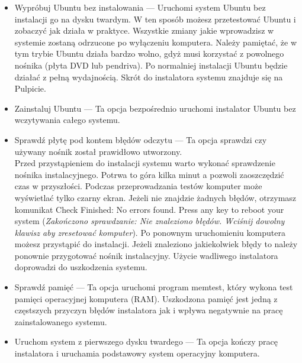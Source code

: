 \begin{itemize}
\item \textcolor{ubuntu_orange}{Wypróbuj Ubuntu bez instalowania} --- Uruchomi system Ubuntu bez instalacji go na dysku twardym. W ten sposób możesz przetestować Ubuntu i zobaczyć jak działa w praktyce. Wszystkie zmiany jakie wprowadzisz w systemie zostaną odrzucone po wyłączeniu komputera. Należy pamiętać, że w tym trybie Ubuntu działa bardzo wolno, gdyż musi korzystać z powolnego nośnika (płyta DVD lub pendriva). Po normalniej instalacji Ubuntu będzie działać z pełną wydajnością. Skrót do instalatora systemu znajduje się na Pulpicie.
\item \textcolor{ubuntu_orange}{Zainstaluj Ubuntu} --- Ta opcja bezpośrednio uruchomi instalator Ubuntu bez wczytywania całego systemu.
\item \textcolor{ubuntu_orange}{Sprawdź płytę pod kontem błędów odczytu} --- Ta opcja sprawdzi czy używany nośnik został prawidłowo utworzony.\\
Przed przystąpieniem do instalacji systemu warto wykonać sprawdzenie nośnika instalacyjnego. Potrwa to góra kilka minut a pozwoli zaoszczędzić czas w przyszłości. Podczas przeprowadzania testów komputer może wyświetlać tylko czarny ekran. Jeżeli nie znajdzie żadnych błędów, otrzymasz komunikat \textcolor{ubuntu_orange}{Check Finished: No errors found. Press any key to reboot your system} (\textit{Zakończono sprawdzanie: Nie znaleziono błędów. Wciśnij dowolny klawisz aby zresetować komputer}). Po ponownym uruchomieniu komputera możesz przystąpić do instalacji. Jeżeli znaleziono jakiekolwiek błędy to należy ponownie przygotować nośnik instalacyjny. Użycie wadliwego instalatora doprowadzi do uszkodzenia systemu. 
\item \textcolor{ubuntu_orange}{Sprawdź pamięć} --- Ta opcja uruchomi program memtest, który wykona test pamięci operacyjnej komputera (RAM). Uszkodzona pamięć jest jedną z częstszych przyczyn błędów instalatora jak i wpływa negatywnie na pracę zainstalowanego systemu.
\item \textcolor{ubuntu_orange}{Uruchom system z pierwszego dysku twardego} --- Ta opcja kończy pracę instalatora i uruchamia podstawowy system operacyjny komputera.
\end{itemize}

